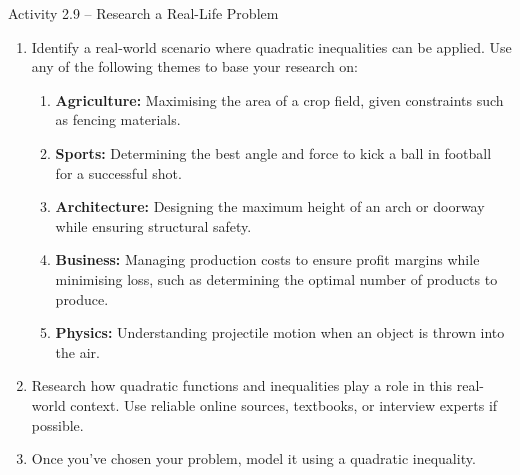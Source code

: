 \begin{activity}{Activity 2.9 -- Research a Real-Life Problem}
\begin{enumerate}
  \item Identify a real-world scenario where quadratic inequalities can be
  applied. Use any of the following themes to base your research on:
  \begin{enumerate}
    \item[a.] \textbf{Agriculture:} Maximising the area of a crop field, given constraints
    such as fencing materials.
    \item[b.] \textbf{Sports:} Determining the best angle and force to kick a ball in
    football for a successful shot.
    \item[c.] \textbf{Architecture:} Designing the maximum height of an arch or
    doorway while ensuring structural safety.
    \item[d.] \textbf{Business:} Managing production costs to ensure profit margins
    while minimising loss, such as determining the optimal number
    of products to produce.
    \item[e.] \textbf{Physics:} Understanding projectile motion when an object is
    thrown into the air.
  \end{enumerate}
  \item Research how quadratic functions and inequalities play a role in this
  real-world context. Use reliable online sources, textbooks, or interview
  experts if possible.
  \item Once you've chosen your problem, model it using a quadratic inequality.


\end{enumerate}
\end{activity}
